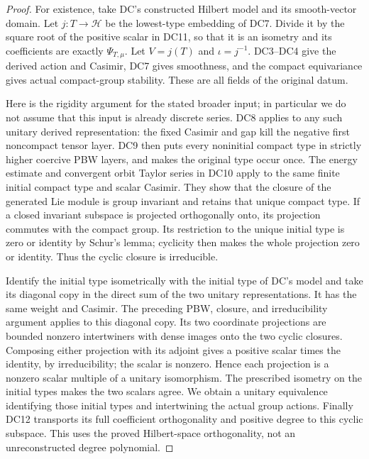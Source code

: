 \documentclass[11pt,a4paper]{article}
\numberwithin{equation}{section}
\theoremstyle{remark}\newtheorem{remark}[theorem]{Remark}
\begin{document}
\begin{proof}
For existence, take DC's constructed Hilbert model and its smooth-vector
domain.  Let $j:T\to\mathcal H$ be the lowest-type embedding of DC7.
Divide it by the square root of the positive scalar in DC11, so that
it is an isometry and its coefficients are exactly $\Psi_{T,\mu}$.
Let $V=j(T)$ and $\iota=j^{-1}$.  DC3--DC4 give the derived action and
Casimir, DC7 gives smoothness, and the compact equivariance gives actual
compact-group stability.  These are all fields of the original datum.

Here is the rigidity argument for the stated broader input; in
particular we do not assume that this input is already discrete series.
DC8 applies to any such unitary derived representation: the fixed
Casimir and gap kill the negative first noncompact tensor layer.
DC9 then puts every noninitial compact type in strictly higher
coercive PBW layers, and makes the original type occur once.
The energy estimate and convergent orbit Taylor series in DC10 apply to
the same finite initial compact type and scalar Casimir.  They show that
the closure of the generated Lie module is group invariant and retains
that unique compact type.  If a closed invariant subspace is projected
orthogonally onto, its projection commutes with the compact group.
Its restriction to the unique initial type is zero or identity by
Schur's lemma; cyclicity then makes the whole projection zero or
identity.  Thus the cyclic closure is irreducible.

Identify the initial type isometrically with the initial type of DC's
model and take its diagonal copy in the direct sum of the two unitary
representations.  It has the same weight and Casimir.  The preceding
PBW, closure, and irreducibility argument applies to this diagonal copy.
Its two coordinate projections are bounded nonzero intertwiners with
dense images onto the two cyclic closures.  Composing either projection
with its adjoint gives a positive scalar times the identity, by
irreducibility; the scalar is nonzero.  Hence each projection is a
nonzero scalar multiple of a unitary isomorphism.  The prescribed
isometry on the initial types makes the two scalars agree.  We obtain
a unitary equivalence identifying those initial types and intertwining
the actual group actions.
Finally DC12 transports its full coefficient orthogonality and positive
degree to this cyclic subspace.  This uses the proved Hilbert-space
orthogonality, not an unreconstructed degree polynomial.
\end{proof}
\end{document}
